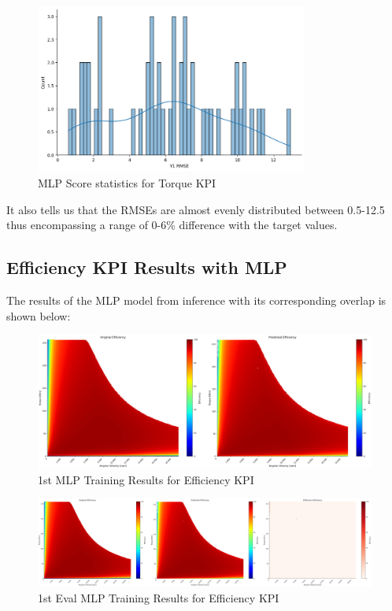 \documentclass{report} %
\begin{document}
\begin{figure}[H]
    \centering
    \includegraphics[width=0.8\textwidth]{./ReportImages/score_MLP_y1.png } 
    \caption{MLP Score statistics for Torque \ac{KPI}} 
    \label{fig:MLP Score statistics for 2D KPI(Torque)}
\end{figure}
It also tells us that the \ac{RMSE}s are almost evenly distributed between 0.5-12.5 thus encompassing a range of 0-6\% difference with the target values.\\

\subsection{Efficiency \ac{KPI} Results with \ac{MLP}}\label{sec:3D Efficiency Grid Results with MLP}

The results of the \ac{MLP} model from inference with its corresponding overlap is shown below: \\

\begin{figure}[H]
    \centering
    \includegraphics[width=1\textwidth]{./ReportImages/KPI3Dprediction1.png} 
    \caption{1st MLP Training Results for Efficiency \ac{KPI}} 
    \label{fig:1st MLP Training Results for 3D KPI(Efficiency)}
\end{figure}

\begin{figure}[H]
    \centering
    \includegraphics[width=1\textwidth]{./ReportImages/evalKPI3Dprediction1.png} 
    \caption{1st Eval MLP Training Results for Efficiency \ac{KPI}} 
    \label{fig:1st Eval MLP Training Results for 3D KPI(Efficiency)}
\end{figure}
\end{document}
